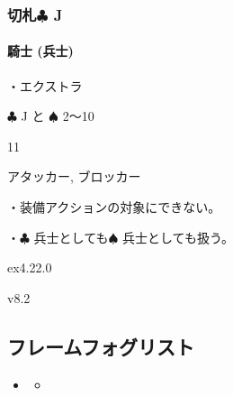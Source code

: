 \documentclass[letterpaper,10pt,dvipdfmx]{sphinxmanual}
\begin{document}
\subsubsection{切札{\normalsize $\clubsuit$} J}
\label{\detokenize{auto/frameActionlist:id97}}

\paragraph{騎士 (兵士)}
\label{\detokenize{auto/frameActionlist:char-knight}}\label{\detokenize{auto/frameActionlist:id98}}
\sphinxAtStartPar
{}

\sphinxAtStartPar
・エクストラ

\sphinxAtStartPar
{} {\normalsize $\clubsuit$} J と {\normalsize $\spadesuit$} 2〜10

\sphinxAtStartPar
{} 11

\sphinxAtStartPar
{} アタッカー, ブロッカー

\sphinxAtStartPar
{}

\sphinxAtStartPar
・装備アクションの対象にできない。

\sphinxAtStartPar
・{\normalsize $\clubsuit$} 兵士としても{\normalsize $\spadesuit$} 兵士としても扱う。

\sphinxAtStartPar
{}  ex4.22.0

\sphinxAtStartPar
{}  v8.2


\subsection{フレームフォグリスト}
\label{\detokenize{auto/frameActionlist:foglist-act-frame}}\label{\detokenize{auto/frameActionlist:id99}}
\begin{sphinxShadowBox}
\begin{itemize}
\item {} 
\sphinxAtStartPar
{}\label{\detokenize{auto/frameActionlist:id268}}{\hyperref[\detokenize{auto/frameActionlist:id101}]{}}
\begin{itemize}
\item {} 
\sphinxAtStartPar
{}\label{\detokenize{auto/frameActionlist:id269}}{\hyperref[\detokenize{auto/frameActionlist:fog-closefog}]{}}

\end{itemize}

\end{itemize}
\end{sphinxShadowBox}
\end{document}
